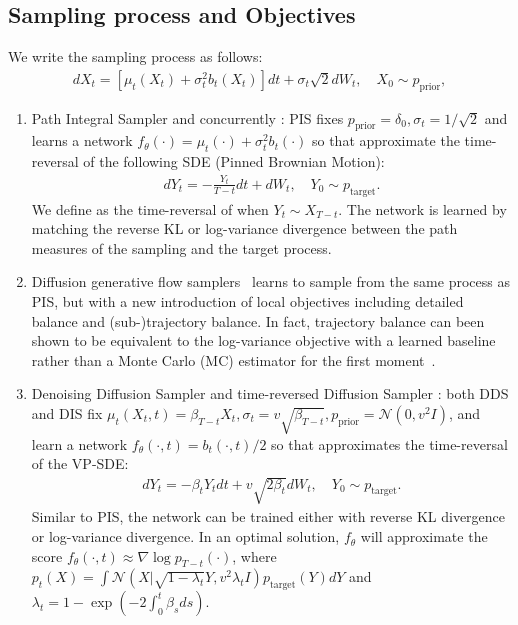 \documentclass{article} %
\def\ptarget{p_\text{target}}
\begin{document}
\subsection{Sampling process and Objectives}
We write the sampling process as follows:
    \begin{align}\label{eq:x_appendix}
        d X_t = \left [\mu_t(X_t) + \sigma_t^2 b_t(X_t) \right] dt + \sigma_t \sqrt{2} dW_t, \quad X_0 \sim p_\text{prior},
    \end{align}

 \begin{enumerate}[label=({{\arabic*}}), leftmargin=*]
        \item Path Integral Sampler \citep[PIS,][]{zhangpath} and concurrently \citep[NSFS, ][]{vargas2021bayesian}: 
        PIS fixes $p_\text{prior} = \delta_0,  \sigma_t=1/\sqrt{2}$ and learns a network $f_\theta(\cdot) =\mu_t(\cdot) + \sigma_t^2 b_t(\cdot)$ so that  approximate the time-reversal of the following SDE (Pinned Brownian Motion):
        \begin{align}\label{eq:pis_y_appendix}
             d Y_t = -\frac{Y_t}{T-t} dt + dW_t, \quad Y_0 \sim \ptarget.
        \end{align}
        We define  as the time-reversal of  when $Y_t \sim X_{T-t}$.
        The network is learned by matching the reverse KL \citep{zhangpath,vargas2021bayesian} or log-variance divergence \citep{richterimproved} between the path measures of the sampling and the target process.
       
       \item Diffusion generative flow samplers~\citep[DFGS,][]{zhangdiffusion} learns to sample from  the same process as PIS,  but with a new introduction of local objectives including detailed balance and (sub-)trajectory balance.
        In fact, trajectory balance can been shown to be equivalent to the log-variance objective with a learned baseline rather than a Monte Carlo (MC) estimator for the first moment~\citep{nusken2021solving}.  
        \item Denoising Diffusion Sampler \citep[DDS,][]{vargasdenoising} and time-reversed Diffusion Sampler \citep[DIS,][]{berneroptimal}: 
        both DDS and DIS fix $\mu_t(X_t, t) = \beta_{T-t} X_t, \sigma_t = v \sqrt{\beta_{T-t}}, p_\text{prior} = \mathcal{N}(0, v^2I)$, and learn a network $f_\theta(\cdot, t) = b_t(\cdot, t)/2 $ so that  approximates the time-reversal of the VP-SDE:
        \begin{align}\label{eq:dds_y_appendix}
            dY_t = -\beta_t Y_t dt + v \sqrt{2\beta_{t}} dW_t, \quad  Y_0 \sim \ptarget.
        \end{align}
        Similar to PIS, the network can be trained either with reverse KL divergence or log-variance divergence.
        In an optimal solution, $f_\theta$ will approximate the score $f_\theta(\cdot, t) \approx \nabla\log p_{T-t}(\cdot)$, where $ p_{t}(X) = \int  \mathcal{N}(X|\sqrt{1-\lambda_t}Y, v^2\lambda_t I) \ptarget(Y)dY$ and $\lambda_t = 1-\exp(-2\int_0^t  \beta_s ds)$.
        

\end{enumerate}
\end{document}
